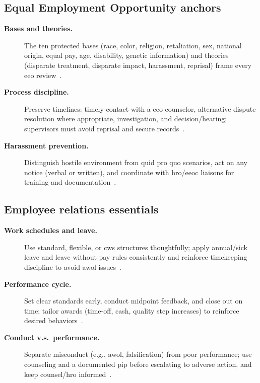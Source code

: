 \documentclass[../main.tex]{subfiles}
\begin{document}
\subsection{Equal Employment Opportunity anchors}
\begin{description}
  \item[\textbf{Bases and theories.}] The ten protected bases (race, color, religion, retaliation, sex, national origin, equal pay, age, disability, genetic information) and theories (disparate treatment, disparate impact, harassment, reprisal) frame every \ac{eeo} review~\autocite{edo-6-1-3-eeo-2025}.
  \item[\textbf{Process discipline.}] Preserve timelines: timely contact with a \ac{eeo} counselor, alternative dispute resolution where appropriate, investigation, and decision/hearing; supervisors must avoid reprisal and secure records~\autocite{edo-6-1-3-eeo-2025}.
  \item[\textbf{Harassment prevention.}] Distinguish hostile environment from quid pro quo scenarios, act on any notice (verbal or written), and coordinate with \ac{hro}/\ac{eeoc} liaisons for training and documentation~\autocite{edo-6-1-3-eeo-2025}.
\end{description}

\subsection{Employee relations essentials}
\begin{description}
  \item[\textbf{Work schedules and leave.}] Use standard, flexible, or \ac{cws} structures thoughtfully; apply annual/sick leave and leave without pay rules consistently and reinforce timekeeping discipline to avoid \ac{awol} issues~\autocite{edo-6-1-4-employee-relations-2025}.
  \item[\textbf{Performance cycle.}] Set clear standards early, conduct midpoint feedback, and close out on time; tailor awards (time-off, cash, quality step increases) to reinforce desired behaviors~\autocite{edo-6-1-4-employee-relations-2025}.
  \item[\textbf{Conduct v.s.\ performance.}] Separate misconduct (e.g., \ac{awol}, falsification) from poor performance; use counseling and a documented \ac{pip} before escalating to adverse action, and keep counsel/\ac{hro} informed~\autocite{edo-6-1-4-employee-relations-2025}.
\end{description}
\end{document}
